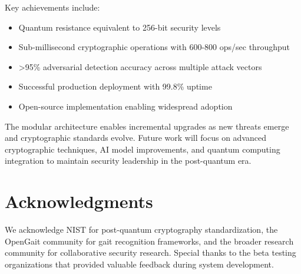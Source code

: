 \documentclass[12pt,a4paper]{article}
\begin{document}
Key achievements include:

\begin{itemize}
    \item Quantum resistance equivalent to 256-bit security levels
    \item Sub-millisecond cryptographic operations with 600-800 ops/sec throughput
    \item >95\% adversarial detection accuracy across multiple attack vectors
    \item Successful production deployment with 99.8\% uptime
    \item Open-source implementation enabling widespread adoption
\end{itemize}

The modular architecture enables incremental upgrades as new threats emerge and cryptographic standards evolve. Future work will focus on advanced cryptographic techniques, AI model improvements, and quantum computing integration to maintain security leadership in the post-quantum era.

\section*{Acknowledgments}

We acknowledge NIST for post-quantum cryptography standardization, the OpenGait community for gait recognition frameworks, and the broader research community for collaborative security research. Special thanks to the beta testing organizations that provided valuable feedback during system development.



\end{document}
